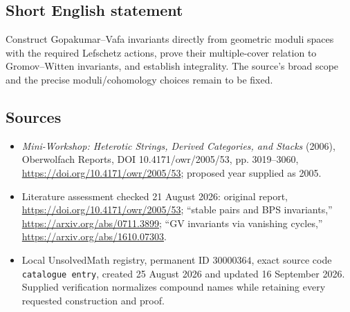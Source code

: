 \documentclass[11pt]{article}
\begin{document}
\subsection{Short English statement}
Construct Gopakumar--Vafa invariants directly from geometric moduli spaces with the required Lefschetz actions, prove their multiple-cover relation to Gromov--Witten invariants, and establish integrality. The source's broad scope and the precise moduli/cohomology choices remain to be fixed.
\subsection{Sources}
\begin{itemize}
\item \emph{Mini-Workshop: Heterotic Strings, Derived Categories, and Stacks} (2006), Oberwolfach Reports, DOI 10.4171/owr/2005/53, pp. 3019--3060, \url{https://doi.org/10.4171/owr/2005/53}; proposed year supplied as 2005.
\item Literature assessment checked 21 August 2026: original report, \url{https://doi.org/10.4171/owr/2005/53}; ``stable pairs and BPS invariants,'' \url{https://arxiv.org/abs/0711.3899}; ``GV invariants via vanishing cycles,'' \url{https://arxiv.org/abs/1610.07303}.
\item Local UnsolvedMath registry, permanent ID $30000364$, exact source code \texttt{catalogue entry}, created 25 August 2026 and updated 16 September 2026. Supplied verification normalizes compound names while retaining every requested construction and proof.
\end{itemize}
\end{document}

